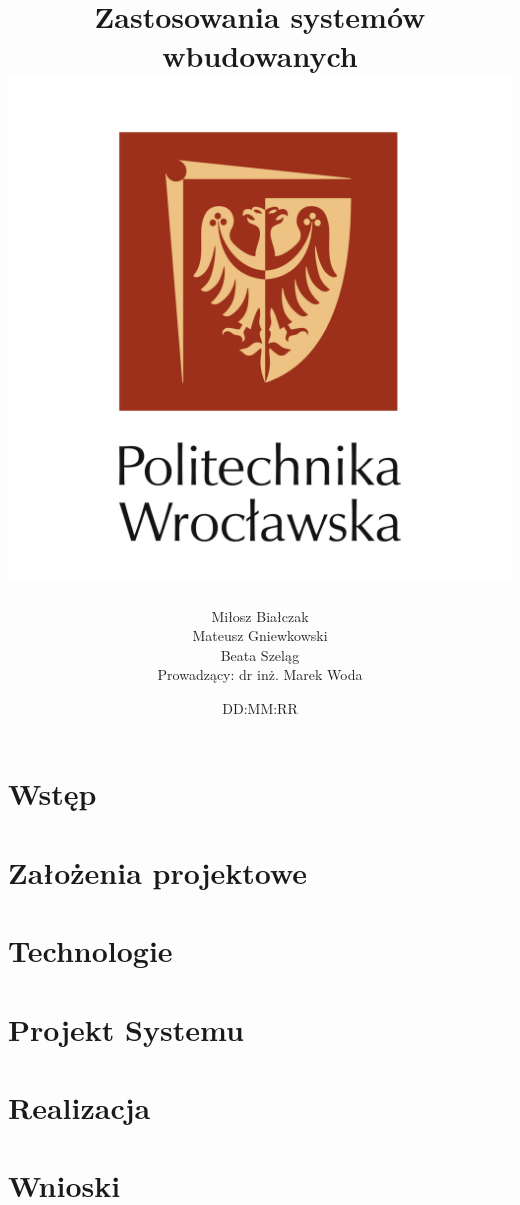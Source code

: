 \documentclass[12pt]{report}
\title{
        {Zastosowania systemów wbudowanych}\\
        {\includegraphics{pwr.png}}
}
\author{
Miłosz Białczak\\
Mateusz Gniewkowski\\
Beata Szeląg\\[15pt]
Prowadzący: dr inż. Marek Woda
}
\date{DD:MM:RR}
\begin{document}
\maketitle

\tableofcontents

%

\chapter{Wstęp}


\chapter{Założenia projektowe}


\chapter{Technologie}


\chapter{Projekt Systemu}


\chapter{Realizacja}


\chapter{Wnioski}

\end{document}
